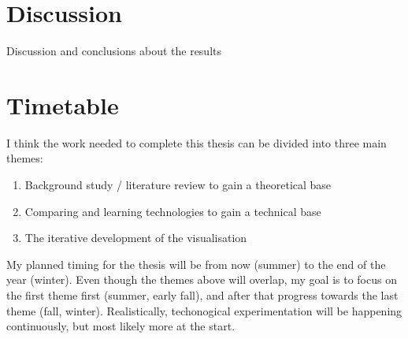 \documentclass[12pt]{article}
\begin{document}
\section{Discussion}

Discussion and conclusions about the results

\section{Timetable}

I think the work needed to complete this thesis can be divided into three main themes:

\begin{enumerate}
	\item Background study / literature review to gain a theoretical base
	\item Comparing and learning technologies to gain a technical base
	\item The iterative development of the visualisation
\end{enumerate}

My planned timing for the thesis will be from now (summer) to the end of the year (winter).
Even though the themes above will overlap,
my goal is to focus on the first theme first (summer, early fall),
and after that progress towards the last theme (fall, winter).
Realistically, techonogical experimentation will be happening continuously,
but most likely more at the start.

\printbibliography
\end{document}
